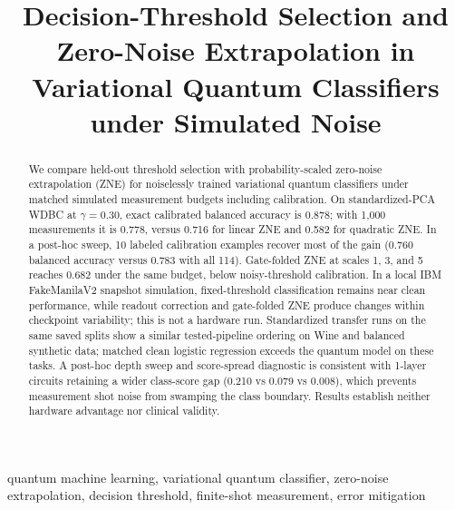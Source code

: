 \documentclass[conference]{IEEEtran}
\title{Decision-Threshold Selection and Zero-Noise Extrapolation in Variational Quantum Classifiers under Simulated Noise}
\author{\IEEEauthorblockN{Author 1, Author 2, Author 3}\IEEEauthorblockA{Affiliations: \\ Corresponding author email: }}
\begin{document}
\maketitle
\begin{abstract}
We compare held-out threshold selection with probability-scaled zero-noise extrapolation (ZNE) for noiselessly trained variational quantum classifiers under matched simulated measurement budgets including calibration. On standardized-PCA WDBC at $\gamma=0.30$, exact calibrated balanced accuracy is 0.878; with 1,000 measurements it is 0.778, versus 0.716 for linear ZNE and 0.582 for quadratic ZNE. In a post-hoc sweep, 10 labeled calibration examples recover most of the gain (0.760 balanced accuracy versus 0.783 with all 114). Gate-folded ZNE at scales 1, 3, and 5 reaches 0.682 under the same budget, below noisy-threshold calibration. In a local IBM FakeManilaV2 snapshot simulation, fixed-threshold classification remains near clean performance, while readout correction and gate-folded ZNE produce changes within checkpoint variability; this is not a hardware run. Standardized transfer runs on the same saved splits show a similar tested-pipeline ordering on Wine and balanced synthetic data; matched clean logistic regression exceeds the quantum model on these tasks. A post-hoc depth sweep and score-spread diagnostic is consistent with 1-layer circuits retaining a wider class-score gap (0.210 vs 0.079 vs 0.008), which prevents measurement shot noise from swamping the class boundary. Results establish neither hardware advantage nor clinical validity.\end{abstract}
\begin{IEEEkeywords}
quantum machine learning, variational quantum classifier, zero-noise extrapolation, decision threshold, finite-shot measurement, error mitigation
\end{IEEEkeywords}
\end{document}
